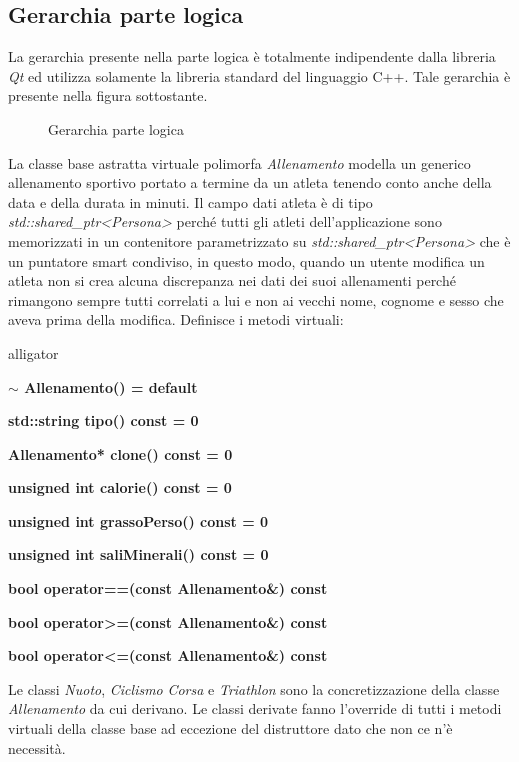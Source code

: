 \documentclass[10pt, a4paper]{article}
\begin{document}
\subsection{Gerarchia parte logica}
La gerarchia presente nella parte logica è totalmente indipendente dalla libreria \emph{Qt} ed utilizza solamente
la libreria standard del linguaggio C++. Tale gerarchia è presente nella figura sottostante.
\begin{figure}[H]
	\centering
	\def\svgwidth{.75\linewidth}
	
	\label{figure:gerarchia_allenamenti}
	\caption{Gerarchia parte logica}
\end{figure}
La classe base astratta virtuale polimorfa \emph{Allenamento} modella un generico
allenamento sportivo portato a termine da un atleta tenendo conto anche della data
e della durata in minuti. Il campo dati atleta è di tipo \emph{std::shared\_ptr<Persona>} perché
tutti gli atleti dell'applicazione sono memorizzati in un contenitore parametrizzato su
\emph{std::shared\_ptr<Persona>} che è un puntatore smart condiviso, in questo modo, quando un utente modifica un atleta non 
si crea alcuna discrepanza nei dati dei suoi allenamenti perché rimangono sempre tutti correlati a lui e non ai vecchi nome, 
cognome e sesso che aveva prima della modifica. 
Definisce i metodi virtuali:
\label{sec:metodi}
\begin{labeling}{alligator}
    \item[\textbf{$\sim$ Allenamento() = default}]
    \item[\textbf{std::string tipo() const = 0}] %
    \item[\textbf{Allenamento* clone() const = 0}] %
    \item[\textbf{unsigned int calorie() const = 0}]%
    \item[\textbf{unsigned int grassoPerso() const = 0}]%
    \item[\textbf{unsigned int saliMinerali() const = 0}]%
    \item[\textbf{bool operator==(const Allenamento\&) const}]
    \item[\textbf{bool operator>=(const Allenamento\&) const}]
    \item[\textbf{bool operator<=(const Allenamento\&) const}]
\end{labeling}
Le classi \emph{Nuoto}, \emph{Ciclismo} \emph{Corsa} e \emph{Triathlon} sono la concretizzazione della
classe \emph{Allenamento} da cui derivano. Le classi derivate fanno l'override di tutti i metodi virtuali
della classe base ad eccezione del distruttore dato che non ce n'è necessità.
\end{document}
